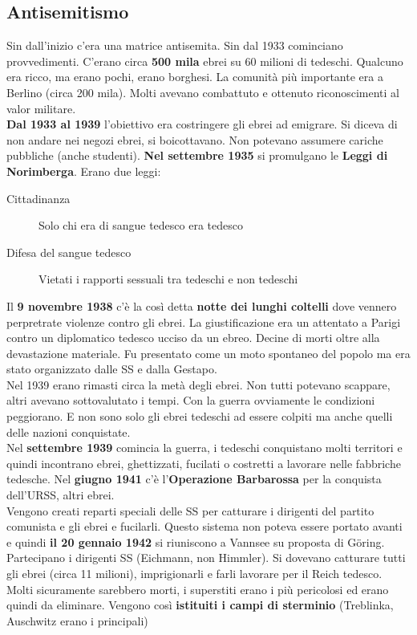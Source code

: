 \subsection{Antisemitismo}
Sin dall'inizio c'era una matrice antisemita. Sin dal 1933 cominciano provvedimenti. C'erano circa
\textbf{500 mila} ebrei su 60 milioni di tedeschi. Qualcuno era ricco, ma erano pochi, erano 
borghesi. La comunità più importante era a Berlino (circa 200 mila). Molti avevano combattuto e 
ottenuto riconoscimenti al valor militare.\\
\textbf{Dal 1933 al 1939} l'obiettivo era costringere gli ebrei ad emigrare. Si diceva di non andare
nei negozi ebrei, si boicottavano. Non potevano assumere cariche pubbliche (anche studenti).
\textbf{Nel settembre 1935} si promulgano le \textbf{Leggi di Norimberga}. Erano due leggi:
\begin{description}
  \item[Cittadinanza] Solo chi era di sangue tedesco era tedesco
  \item[Difesa del sangue tedesco] Vietati i rapporti sessuali tra tedeschi e non tedeschi
\end{description}
Il \textbf{9 novembre 1938} c'è la così detta \textbf{notte dei lunghi coltelli} dove vennero
perpretrate violenze contro gli ebrei. La giustificazione era un attentato a Parigi contro un
diplomatico tedesco ucciso da un ebreo. Decine di morti oltre alla devastazione materiale. Fu
presentato come un moto spontaneo del popolo ma era stato organizzato dalle SS e dalla Gestapo.\\
Nel 1939 erano rimasti circa la metà degli ebrei. Non tutti potevano scappare, altri avevano 
sottovalutato i tempi. Con la guerra ovviamente le condizioni peggiorano. E non sono solo gli ebrei
tedeschi ad essere colpiti ma anche quelli delle nazioni conquistate.\\
Nel \textbf{settembre 1939} comincia la guerra, i tedeschi conquistano molti territori e quindi
incontrano ebrei, ghettizzati, fucilati o costretti a lavorare nelle fabbriche tedesche. Nel
\textbf{giugno 1941} c'è l'\textbf{Operazione Barbarossa} per la conquista dell'URSS, altri ebrei.\\
Vengono creati reparti speciali delle SS per catturare i dirigenti del partito comunista e gli ebrei
e fucilarli. Questo sistema non poteva essere portato avanti e quindi \textbf{il 20 gennaio 1942} 
si riuniscono a Vannsee su proposta di Göring. Partecipano i dirigenti SS (Eichmann, non Himmler).
Si dovevano catturare tutti gli ebrei (circa 11 milioni), imprigionarli e farli lavorare per il Reich
tedesco. Molti sicuramente sarebbero morti, i superstiti erano i più pericolosi ed erano quindi da
eliminare. Vengono così \textbf{istituiti i campi di sterminio} (Treblinka, Auschwitz erano i 
principali)
